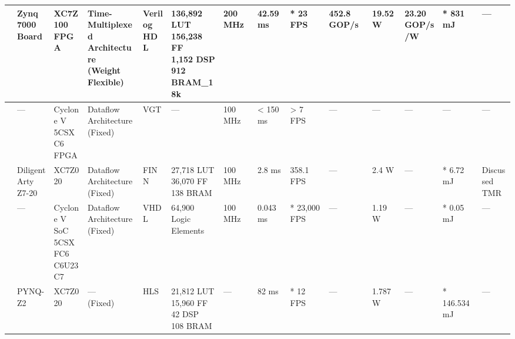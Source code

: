 \begin{center}
{\begin{tabular}{llllllllllllll}
\cite{liEfficientObjectDetection2019} & \makecell[tl]{Zynq 7000\\ Board} & \makecell[tl]{XC7Z100\\ FPGA} & \makecell[tl]{Time-Multiplexed\\ Architecture\\ (Weight Flexible)} & \makecell[tl]{Verilog\\ HDL} & \makecell[tl]{136,892 LUT\\ 156,238 FF\\ 1,152 DSP\\ 912 BRAM\_18k} & 200 MHz & 42.59 ms & * 23 FPS & 452.8 GOP/s & 19.52 W & \makecell[tl]{23.20\\ GOP/s/W} & * 831 mJ & --- \\ \hline
\cite{bahlLowpowerNeuralNetworks2019} & --- & \makecell[tl]{Cyclone V\\ 5CSXC6\\ FPGA} & \makecell[tl]{Dataflow\\ Architecture\\ (Fixed)} & VGT & --- & 100 MHz & < 150 ms & > 7 FPS & --- & --- & --- & --- & --- \\ \hline
\cite{reiterFPGAAccelerationQuantized2020} & \makecell[tl]{Diligent\\ Arty\\ Z7-20} & XC7Z020 & \makecell[tl]{Dataflow\\ Architecture\\ (Fixed)} & FINN & \makecell[tl]{27,718 LUT\\ 36,070 FF\\ 138 BRAM} & 100 MHz & 2.8 ms & 358.1 FPS & --- & 2.4 W & --- & * 6.72 mJ & \makecell[tl]{Discussed\\ TMR}  \\ \hline
\cite{lemaireFPGAbasedHybridNeural2020} & --- & \makecell[tl]{Cyclone V\\ SoC\\ 5CSXFC6\\C6U23C7} & \makecell[tl]{Dataflow\\ Architecture\\ (Fixed)} & VHDL & \makecell[tl]{64,900\\ Logic Elements} & 100 MHz & 0.043 ms & * 23,000 FPS & --- & 1.19 W & --- & * 0.05 mJ & --- \\ \hline
\cite{lentEvaluatingCognitiveNetwork2020} & PYNQ-Z2 & XC7Z020 & \makecell[tl]{---\\ (Fixed)} & HLS & \makecell[tl]{21,812 LUT\\ 15,960 FF\\ 42 DSP\\ 108 BRAM} & --- & 82 ms & * 12 FPS & --- & 1.787 W & --- & * 146.534 mJ & --- \\ \hline

\end{tabular}}
\end{center}
